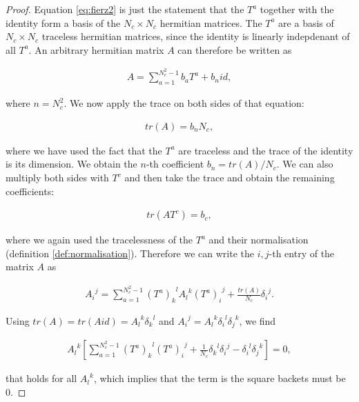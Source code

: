 \documentclass{article}
\theoremstyle{definition}
\numberwithin{equation}{section}
\begin{document}
\begin{proof}

Equation \eqref{eq:fierz2} is just the statement that the $T^a$ together with the identity form a basis of the $N_c \times N_c$ hermitian matrices. The $T^a$ are a basis of $N_c \times N_c$ traceless hermitian matrices, since the identity is linearly indepdenant of all $T^a$. An arbitrary hermitian matrix $A$ can therefore be written as

\begin{align*}
    A = \sum_{a=1}^{N_c^2 -1} b_a T^a + b_n id,
\end{align*}

where $n=N_c^2$. We now apply the trace on both sides of that equation:

\begin{align*}
    tr \left( A \right) = b_n N_c,
\end{align*}

where we have used the fact that the $T^a$ are traceless and the trace of the identity is its dimension. We obtain the $n$-th coefficient $b_n = tr \left( A \right) /N_c$. We can also multiply both sides with $T^c$ and then take the trace and obtain the remaining coefficients:

\begin{align*}
    tr \left( A T^c \right) = b_c,
\end{align*}

where we again used the tracelessness of the $T^a$ and their normalisation (definition \ref{def:normalisation}). Therefore we can write the $i,j$-th entry of the matrix $A$ as

\begin{align*}
    {A_{i}}^{j} = \sum_{a=1}^{N_c^2 -1} {(T^a)_{k}}^{l} {A_{l}}^{k} {(T^a)_{i}}^{j} + \frac{tr \left( A \right)}{N_c} {\delta_{i}}^{j}.
\end{align*}

Using $tr \left( A \right) = tr \left( A id \right) = {A_{l}}^{k} {\delta_{k}}^{l}$ and ${A_{i}}^{j} = {A_{l}}^{k} {\delta_i}^l {\delta_j}^k$, we find

\begin{align*}
    {A_{l}}^{k} \left[ \sum_{a=1}^{N_c^2 -1} {(T^a)_k}^l {(T^a)_i}^j + \frac{1}{N_c} {\delta_k}^l {\delta_i}^j - {\delta_i}^l {\delta_j}^k \right] = 0,
\end{align*}

that holds for all ${A_{l}}^{k}$, which implies that the term is the square backets must be $0$.

\end{proof}
\end{document}
